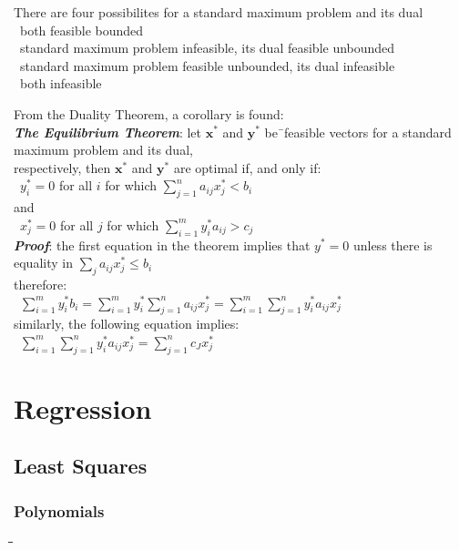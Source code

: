 \documentclass[10pt,letterpaper]{scrartcl}
\newcommand{\boph}[1]{\emph{\textbf{#1}}} %
\newcommand{\tbul}{\textbullet}
\newcommand{\tabDef}{\hspace{2em}\=\hspace{2em}\=\hspace{2em}\=\hspace{2em}\=\kill}
\begin{document}
There are four possibilites for a standard maximum problem and its dual \\
\tbul\ both feasible bounded \\
\tbul\ standard maximum problem infeasible, its dual feasible unbounded \\
\tbul\ standard maximum problem feasible unbounded, its dual infeasible \\
\tbul\ both infeasible \\
\begin{tabbing}
From the Duality Theorem, a corollary is found: \\
\boph{The Equilibrium Theorem}: let $\mathbf{x^{*}}$ and $\mathbf{y^{*}}$ be\=\ feasible vectors for a standard maximum problem and its dual, \\ respectively, then $\mathbf{x^{*}}$ and $\mathbf{y^{*}}$ are optimal if, and only if: \\
\>\ $y^{*}_i = 0$ for all $i$ for which $\displaystyle\sum_{j=1}^{n}a_{ij}x^{*}_j < b_i$ \\
and \\
\>\ $x^{*}_j = 0$ for all $j$ for which $\displaystyle\sum_{i=1}^{m}y^{*}_ia_{ij} > c_j$  \\
\boph{Proof}: the first equation in the theorem implies that $y^{*}=0$ unless there is equality in $\displaystyle\sum_j a_{ij}x^{*}_j\leq b_i$ \\
therefore: \\
\>\ $\displaystyle\sum_{i=1}^{m}y^{*}_{i}b_i = \sum_{i=1}^{m}y^{*}_i\sum_{j=1}^{n}a_{ij}x^{*}_j = \sum_{i=1}^{m}\sum_{j=1}^{n}y^{*}_ia_{ij}x^{*}_j$ \\
similarly, the following equation implies: \\
\>\ $\displaystyle\sum_{i=1}^m\sum_{j=1}^ny^*_ia_{ij}x^*_j=\sum_{j=1}^nc_Jx^*_j$ \\
\end{tabbing}

\newpage\section{Regression}
\subsection{Least Squares}
\subsubsection*{Polynomials}\begin{tabbing}\tabDef 

\end{tabbing}
\end{document}
